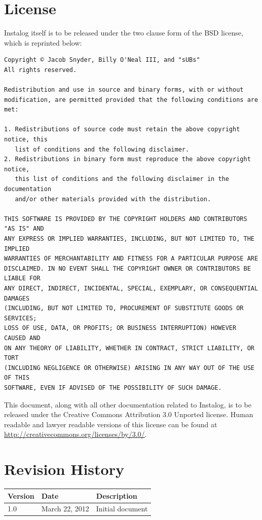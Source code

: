 \documentclass[letterpaper,12pt]{article}
\begin{document}
\newpage


\appendix
\section{License} \label{license}
Instalog itself is to be released under the two clause form of the BSD license,
which is reprinted below:

\begin{verbatim}
Copyright © Jacob Snyder, Billy O'Neal III, and "sUBs"
All rights reserved.

Redistribution and use in source and binary forms, with or without
modification, are permitted provided that the following conditions are met: 

1. Redistributions of source code must retain the above copyright notice, this
   list of conditions and the following disclaimer. 
2. Redistributions in binary form must reproduce the above copyright notice,
   this list of conditions and the following disclaimer in the documentation
   and/or other materials provided with the distribution. 

THIS SOFTWARE IS PROVIDED BY THE COPYRIGHT HOLDERS AND CONTRIBUTORS "AS IS" AND
ANY EXPRESS OR IMPLIED WARRANTIES, INCLUDING, BUT NOT LIMITED TO, THE IMPLIED
WARRANTIES OF MERCHANTABILITY AND FITNESS FOR A PARTICULAR PURPOSE ARE
DISCLAIMED. IN NO EVENT SHALL THE COPYRIGHT OWNER OR CONTRIBUTORS BE LIABLE FOR
ANY DIRECT, INDIRECT, INCIDENTAL, SPECIAL, EXEMPLARY, OR CONSEQUENTIAL DAMAGES
(INCLUDING, BUT NOT LIMITED TO, PROCUREMENT OF SUBSTITUTE GOODS OR SERVICES;
LOSS OF USE, DATA, OR PROFITS; OR BUSINESS INTERRUPTION) HOWEVER CAUSED AND
ON ANY THEORY OF LIABILITY, WHETHER IN CONTRACT, STRICT LIABILITY, OR TORT
(INCLUDING NEGLIGENCE OR OTHERWISE) ARISING IN ANY WAY OUT OF THE USE OF THIS
SOFTWARE, EVEN IF ADVISED OF THE POSSIBILITY OF SUCH DAMAGE.
\end{verbatim}

This document, along with all other documentation related to Instalog,  is to be
released under the Creative Commons Attribution 3.0 Unported license. Human
readable and lawyer readable versions of this license can be found at
\url{http://creativecommons.org/licenses/by/3.0/}.

\newpage

\section{Revision History} \label{revision_history}
\begin{tabular}{| l | l | l |}
\hline
\textbf{Version} & \textbf{Date} & \textbf{Description} \\
\hline
1.0 & March 22, 2012 & Initial document \\
\hline
\end{tabular}
\end{document}
